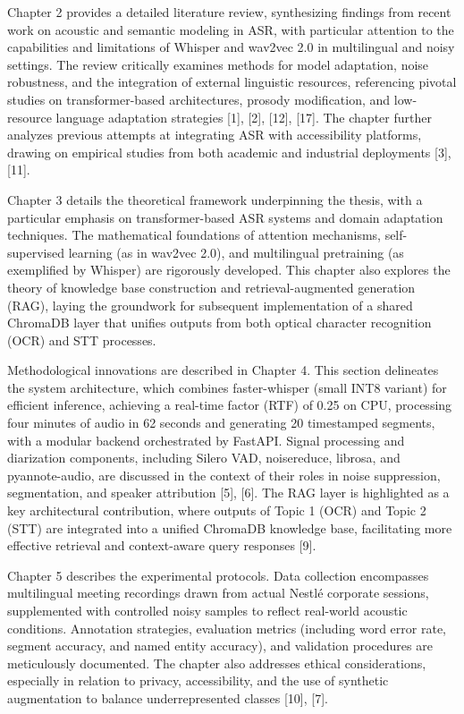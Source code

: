 \documentclass[12pt,a4paper]{article}
\begin{document}
Chapter 2 provides a detailed literature review, synthesizing findings from recent work on acoustic and semantic modeling in ASR, with particular attention to the capabilities and limitations of Whisper and wav2vec 2.0 in multilingual and noisy settings. The review critically examines methods for model adaptation, noise robustness, and the integration of external linguistic resources, referencing pivotal studies on transformer-based architectures, prosody modification, and low-resource language adaptation strategies [1], [2], [12], [17]. The chapter further analyzes previous attempts at integrating ASR with accessibility platforms, drawing on empirical studies from both academic and industrial deployments [3], [11].


Chapter 3 details the theoretical framework underpinning the thesis, with a particular emphasis on transformer-based ASR systems and domain adaptation techniques. The mathematical foundations of attention mechanisms, self-supervised learning (as in wav2vec 2.0), and multilingual pretraining (as exemplified by Whisper) are rigorously developed. This chapter also explores the theory of knowledge base construction and retrieval-augmented generation (RAG), laying the groundwork for subsequent implementation of a shared ChromaDB layer that unifies outputs from both optical character recognition (OCR) and STT processes.


Methodological innovations are described in Chapter 4. This section delineates the system architecture, which combines faster-whisper (small INT8 variant) for efficient inference, achieving a real-time factor (RTF) of 0.25 on CPU, processing four minutes of audio in 62 seconds and generating 20 timestamped segments, with a modular backend orchestrated by FastAPI. Signal processing and diarization components, including Silero VAD, noisereduce, librosa, and pyannote-audio, are discussed in the context of their roles in noise suppression, segmentation, and speaker attribution [5], [6]. The RAG layer is highlighted as a key architectural contribution, where outputs of Topic 1 (OCR) and Topic 2 (STT) are integrated into a unified ChromaDB knowledge base, facilitating more effective retrieval and context-aware query responses [9].


Chapter 5 describes the experimental protocols. Data collection encompasses multilingual meeting recordings drawn from actual Nestlé corporate sessions, supplemented with controlled noisy samples to reflect real-world acoustic conditions. Annotation strategies, evaluation metrics (including word error rate, segment accuracy, and named entity accuracy), and validation procedures are meticulously documented. The chapter also addresses ethical considerations, especially in relation to privacy, accessibility, and the use of synthetic augmentation to balance underrepresented classes [10], [7].
\end{document}
